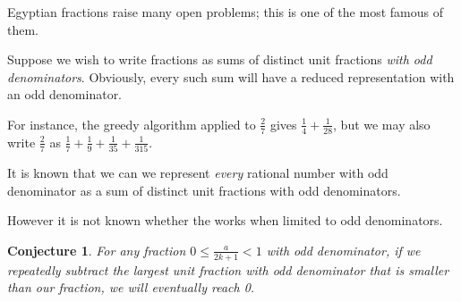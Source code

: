 \documentclass[12pt]{article}
\newtheorem{conjecture}{Conjecture}
\begin{document}
Egyptian fractions raise many open problems; this is one of the most famous of them.

Suppose we wish to write fractions as sums of distinct unit fractions \emph{with odd denominators}.  Obviously, every such sum will have a reduced representation with an odd denominator.

For instance, the greedy algorithm applied to $\frac{2}{7}$ gives $\frac{1}{4}+\frac{1}{28}$, but we may also write $\frac{2}{7}$ as $\frac{1}{7}+\frac{1}{9}+\frac{1}{35}+\frac{1}{315}$.

It is known that we can we represent \emph{every} rational number with odd denominator as a sum of distinct unit fractions with odd denominators.

However it is not known whether the  works when limited to odd denominators.  

\begin{conjecture}
For any fraction $0\le \frac{a}{2k+1} < 1$ with odd denominator, if we repeatedly subtract the largest unit fraction with odd denominator that is smaller than our fraction, we will eventually reach 0.
\end{conjecture}
\end{document}
